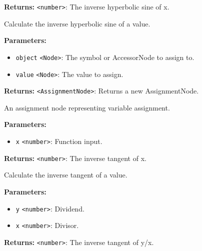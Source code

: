 \documentclass[12pt,a4paper]{article}
\begin{document}
\noindent \textbf{Returns:} \texttt{<number>}: The inverse hyperbolic sine of \textasciigrave{}x\textasciigrave{}.

\noindent Calculate the inverse hyperbolic sine of a value.

\vspace{5mm}
\noindent {}


\noindent \textbf{Parameters:}
\begin{itemize}
  \item \texttt{object} \texttt{<Node>}: The symbol or AccessorNode to assign to.
  \item \texttt{value} \texttt{<Node>}: The value to assign.
\end{itemize}

\noindent \textbf{Returns:} \texttt{<AssignmentNode>}: Returns a new AssignmentNode.

\noindent An assignment node representing variable assignment.

\vspace{5mm}
\noindent {}


\noindent \textbf{Parameters:}
\begin{itemize}
  \item \texttt{x} \texttt{<number>}: Function input.
\end{itemize}

\noindent \textbf{Returns:} \texttt{<number>}: The inverse tangent of \textasciigrave{}x\textasciigrave{}.

\noindent Calculate the inverse tangent of a value.

\vspace{5mm}
\noindent {}


\noindent \textbf{Parameters:}
\begin{itemize}
  \item \texttt{y} \texttt{<number>}: Dividend.
  \item \texttt{x} \texttt{<number>}: Divisor.
\end{itemize}

\noindent \textbf{Returns:} \texttt{<number>}: The inverse tangent of \textasciigrave{}y/x\textasciigrave{}.
\end{document}
